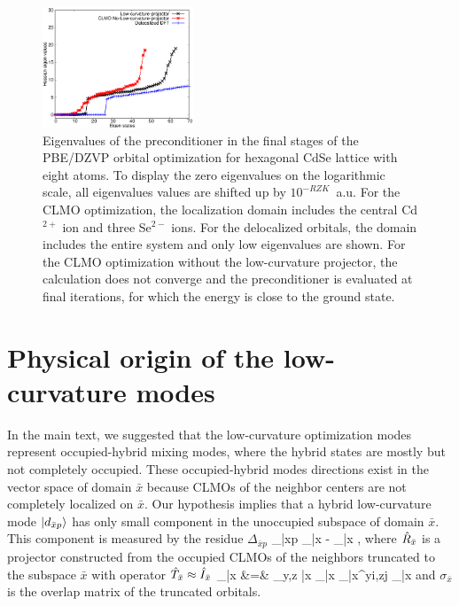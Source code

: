 \documentclass[aps,prl,twocolumn,reprint,amsmath,amssymb]{revtex4-1}
\begin{document}
\begin{figure}[t!]
\centering
\includegraphics[width=0.4\textwidth]{Hesseig}
\caption{Eigenvalues of the preconditioner in the final stages of the PBE/DZVP orbital optimization for hexagonal CdSe lattice with eight atoms. To display the zero eigenvalues on the logarithmic scale, all eigenvalues values are shifted up by $10^{-RZK}$~a.u. For the CLMO optimization, the localization domain includes the central Cd$^{2+}$ ion and three Se$^{2-}$ ions. For the delocalized orbitals, the domain includes the entire system and only low eigenvalues are shown. For the CLMO optimization without the low-curvature projector, the calculation does not converge and the preconditioner is evaluated at final iterations, for which the energy is close to the ground state.}
\label{sfig:hesseig}
\end{figure}

\section{Physical origin of the low-curvature modes}

In the main text, we suggested that the low-curvature optimization modes represent occupied-hybrid mixing modes, where the hybrid states are mostly but not completely occupied. 
These occupied-hybrid modes directions exist in the vector space of domain $\bar{x}$ because CLMOs of the neighbor centers are not completely localized on $\bar{x}$. 
Our hypothesis implies that a hybrid low-curvature mode $\vert d_{\bar{x}p} \rangle$ has only small component in the unoccupied subspace of domain $\bar{x}$. 
This component is measured by the residue $\Delta_{\bar{x}p}$ 
%
\bea
\Delta_{\bar{x}p} \equiv {} _{\bar{x}} - _{\bar{x}} , 
\eea
%
where $\hat{R}_{\bar{x}}$ is a projector constructed from the occupied CLMOs of the neighbors truncated to the subspace $\bar{x}$ with operator $\hat{T}_{\bar{x}} \approx \hat{I}_{\bar{x}}$
%
\bea
{}_{\bar{x}} &=& \sum_{y,z \in \bar{x}} _{\bar{x}}  \sigma_{\bar{x}}^{yi,zj}  _{\bar{x}}
\eea
%
and $\sigma_{\bar{x}}$ is the overlap matrix of the truncated orbitals. 
\end{document}
